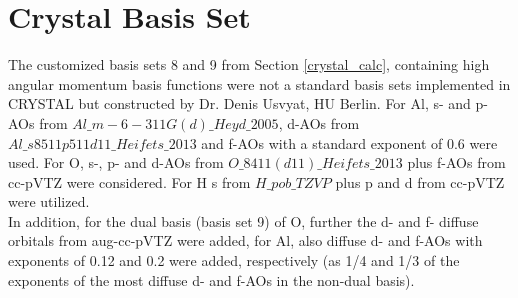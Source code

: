 \documentclass[11pt,DIV=13,BCOR=5mm,a4paper,headinclude]{scrbook}
\begin{document}

\appendix

\captionsetup{labelformat=myformat}
\def\thefigure{A.\arabic{figure}}
\def\thetable{A.\arabic{table}}
\section{Crystal Basis Set}\label{app_combined_basis}
The customized basis sets 8 and 9 from Section \ref{crystal_calc}, containing high angular momentum basis functions were not a standard basis sets implemented in CRYSTAL but constructed by Dr. Denis Usvyat, HU Berlin.
For Al, s- and p-AOs from $Al\_m-6-311G(d)\_Heyd\_2005$, d-AOs from $Al\_s8511p511d11\_Heifets\_2013$ and f-AOs with a standard exponent of 0.6 were used.
For O, s-, p- and d-AOs from $O\_8411(d11)\_Heifets\_2013$ plus f-AOs from cc-pVTZ were considered.
For H s from $H\_pob\_TZVP$ plus p and d from cc-pVTZ were utilized.\\
In addition, for the dual basis (basis set 9) of O, further the d- and f- diffuse orbitals from aug-cc-pVTZ were added, for Al, also diffuse d- and f-AOs with exponents of 0.12 and 0.2 were added, respectively (as 1/4 and 1/3 of the exponents of the most diffuse d- and f-AOs in the non-dual basis).
\end{document}
